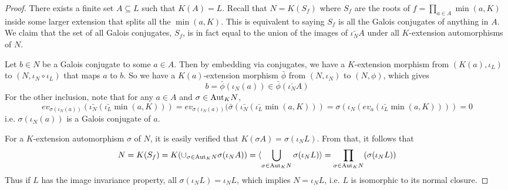 \documentclass[../book.tex]{subfiles}
\begin{document}
\begin{proof}
    There exists a finite set $A\subseteq L$ such that $K(A) = L$.
    Recall that $N = K(S_f)$ where $S_f$ are the roots of 
    $f = \prod_{a \in A} \min(a,K)$ inside some larger extension 
    that splits all the $\min(a,K)$. 
    This is equivalent to saying $S_f$ is all the Galois conjugates
    of anything in $A$. 
    We claim that the set of all Galois conjugates, $S_f$,
    is in fact equal to the union of the images of $\bar{\iota_N} A$ 
    under all $K$-extension automorphisms of $N$. 
    
    Let $b \in N$ be a Galois conjugate to some $a \in A$. 
    Then by embedding via conjugates, we have a $K$-extension morphism
    from $(K(a),\iota_L)$ to $(N,\iota_N\circ\iota_L)$ that maps $a$ to $b$.
    So we have a $K(a)$-extension morphism $\bar{\phi}$ 
    from $(N,\iota_N)$ to $(N,\phi)$, which gives \[
        b = \bar{\phi}(\iota_N(a)) \in \bar{\phi} (\bar{\iota_N} A)
    \]
    For the other inclusion, 
    note that for any $a \in A$ and $\sigma \in \mathrm{Aut}_{K}N$,
    \[
        ev_{\sigma(\iota_N(a))}(\bar{\iota_N}(\bar{\iota_L}\min(a,K)))
        = ev_{\sigma(\iota_N(a))}
        (\bar{\sigma}(\bar{\iota_N}(\bar{\iota_L}\min(a,K)))
        = \sigma(\iota_N( ev_a (\bar{\iota_L}\min(a,K)) ))
        = 0
    \]
    i.e. $\sigma(\iota_N(a))$ is a Galois conjugate of $a$. 
    
    For a $K$-extension automorphism $\sigma$ of $N$, 
    it is easily verified that $K(\sigma A) = \sigma(\iota_N L)$.
    From that, it follows that
    \[
        N = K(S_f) = K(\cup_{\sigma\in\mathrm{Aut}_{K}N} \sigma(\iota_N A))
        = \langle\bigcup_{\sigma \in \mathrm{Aut}_{K}N} \sigma(\iota_N L)\rangle
        = \prod_{\sigma\in\mathrm{Aut}_{K}N} (\sigma(\iota_N L))
    \]
    Thus if $L$ has the image invariance property, 
    all $\sigma(\iota_N L) = \iota_N L$, 
    which implies $N = \iota_N L$, 
    i.e. $L$ is isomorphic to its normal closure.
    
\end{proof}
\end{document}
